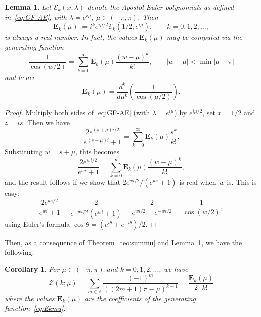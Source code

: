 \documentclass[11pt, oneside]{article}
\newcommand{\Z}{\mathbb{Z}}
\newcommand{\calE}{\mathcal{E}}
\newcommand{\bfE}{\mathbf{E}}
\newcommand{\calZ}{\mathcal{Z}}
\theoremstyle{plain}
\newtheorem{lemma}[theorem]{Lemma}
\newtheorem{corollary}[theorem]{Corollary}
\theoremstyle{definition}
\begin{document}
\begin{lemma}
\label{lem:Ekmu}
Let $\calE_k(x;\lambda)$ denote the Apostol-Euler polynomials as defined in~\eqref{eq:GF-AE}, with $\lambda = e^{i\mu}$, $\mu \in (-\pi,\pi)$. Then
\begin{equation*}
  \bfE _k(\mu) := i^k e^{i\mu/2} \calE_k(1/2;e^{i\mu}), \qquad k=0,1,2,\dots,
\end{equation*}
is always a real number. In fact, the values $\bfE_k(\mu)$ may be computed via the generating function
\begin{equation}
\label{eq:Ekmu}
  \frac{1}{\cos(w/2)} = \sum_{k=0}^{\infty} \bfE_k(\mu) \frac{(w-\mu)^k}{k!},
  \qquad |w - \mu| < \min |\mu \pm \pi| 
\end{equation}
and hence
\[
  \bfE_k(\mu) = \frac{d^k}{d\mu^k} \left(\frac{1}{\cos(\mu/2)}\right).
\]
\end{lemma}

\begin{proof}
Multiply both sides of \eqref{eq:GF-AE} (with $\lambda = e^{i\mu}$) by $e^{i\mu/2}$, set $x=1/2$ and $z = is$. Then we have
\[
  \frac{2 e^{(s+\mu)i/2}}{e^{(s+\mu)i}+1}
  = \sum_{k=0}^\infty \bfE_k(\mu) \frac{s^k}{k!}.
\]
Substituting $w=s+\mu$, this becomes
\[
  \frac{2 e^{wi/2}}{e^{wi}+1}
  = \sum_{k=0}^\infty \bfE_k(\mu) \frac{(w-\mu)^k}{k!},
\]
and the result follows if we show that $2 e^{wi/2}/(e^{wi}+1)$ is real when~$w$ is. 
This is easy:
\[
  \frac{2 e^{wi/2}}{e^{wi}+1}
  = \frac{2}{e^{-wi/2}(e^{wi}+1)}
  = \frac{2}{e^{wi/2}+e^{-wi/2}}
  = \frac{1}{\cos(w/2)},
\]
using Euler's formula $\cos\theta = (e^{i\theta}+e^{-i\theta})/2$.
\end{proof}



Then, as a consequence of Theorem~\ref{teo:summu} and Lemma~\ref{lem:Ekmu}, we have the following:

\begin{corollary}
\label{cor:summu}
For $\mu \in (-\pi,\pi)$ and $k=0,1,2,\dots$, we have
\[
  \calZ(k;\mu) = \sum_{m\in\Z} \frac{(-1)^m}{((2m+1)\pi - \mu)^{k+1}}
  = \frac{\bfE_k(\mu)}{2 \cdot k!}
\]
where the values $\bfE_k(\mu)$ are the coefficients of the generating function~\eqref{eq:Ekmu}.
\end{corollary}
\end{document}
